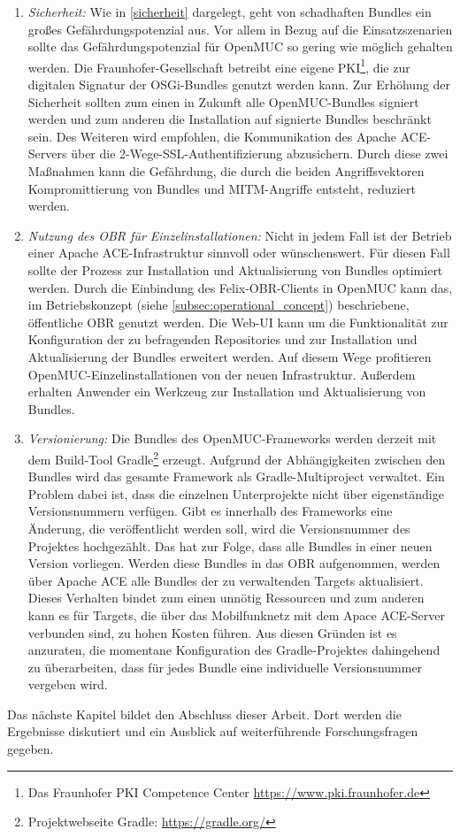 \begin{enumerate}
 \item \textit{Sicherheit:}
 Wie in \autoref{sicherheit} dargelegt, geht von schadhaften Bundles ein großes Gefährdungspotenzial aus.
 Vor allem in Bezug auf die Einsatzszenarien sollte das Gefährdungspotenzial für OpenMUC so gering wie möglich gehalten werden.
 Die Fraunhofer-Gesellschaft betreibt eine eigene \ac{PKI}\footnote{Das Fraunhofer PKI Competence Center \url{https://www.pki.fraunhofer.de}},
 die zur digitalen Signatur der \ac{OSGi}-Bundles genutzt werden kann.
 Zur Erhöhung der Sicherheit sollten zum einen in Zukunft alle OpenMUC-Bundles signiert werden und
 zum anderen die Installation auf signierte Bundles beschränkt sein.
 Des Weiteren wird empfohlen, die Kommunikation des Apache ACE-Servers über die 2-Wege-SSL-Authentifizierung abzusichern.
 Durch diese zwei Maßnahmen kann die Gefährdung, die durch die beiden Angriffsvektoren Kompromittierung von Bundles und \ac{MITM}-Angriffe entsteht, reduziert werden.
   
 \item \textit{Nutzung des OBR für Einzelinstallationen:}
 Nicht in jedem Fall ist der Betrieb einer Apache ACE-Infrastruktur sinnvoll oder wünschenswert. 
 Für diesen Fall sollte der Prozess zur Installation und Aktualisierung von Bundles optimiert werden.
 Durch die Einbindung des Felix-OBR-Clients in OpenMUC kann das, im Betriebskonzept (siehe \autoref{subsec:operational_concept}) beschriebene, 
 öffentliche \ac{OBR} genutzt werden.
 Die Web-UI kann um die Funktionalität zur Konfiguration der zu befragenden Repositories und zur Installation und Aktualisierung der Bundles erweitert werden.
 Auf diesem Wege profitieren OpenMUC-Einzelinstallationen von der neuen Infrastruktur.
 Außerdem erhalten Anwender ein Werkzeug zur Installation und Aktualisierung von Bundles.
 
 \item \textit{Versionierung:}
 Die Bundles des OpenMUC-Frameworks werden derzeit mit dem Build-Tool Gradle\footnote{Projektwebseite Gradle: \url{https://gradle.org/}} erzeugt.
 Aufgrund der Abhängigkeiten zwischen den Bundles wird das gesamte Framework als Gradle-Multiproject verwaltet. 
 Ein Problem dabei ist, dass die einzelnen Unterprojekte nicht über eigenständige Versionsnummern verfügen.
 Gibt es innerhalb des Frameworks eine Änderung, die veröffentlicht werden soll, wird die Versionsnummer des Projektes hochgezählt.
 Das hat zur Folge, dass alle Bundles in einer neuen Version vorliegen. 
 Werden diese Bundles in das \ac{OBR} aufgenommen, werden über Apache ACE alle Bundles der zu verwaltenden Targets aktualisiert.
 Dieses Verhalten bindet zum einen unnötig Ressourcen und zum anderen kann es für Targets,
 die über das Mobilfunknetz mit dem Apace ACE-Server verbunden sind, zu hohen Kosten führen.
 Aus diesen Gründen ist es anzuraten, die momentane Konfiguration des Gradle-Projektes dahingehend zu überarbeiten,
 dass für jedes Bundle eine individuelle Versionsnummer vergeben wird.
 
\end{enumerate}

Das nächste Kapitel bildet den Abschluss dieser Arbeit. 
Dort werden die Ergebnisse diskutiert und ein Ausblick auf weiterführende Forschungsfragen gegeben.